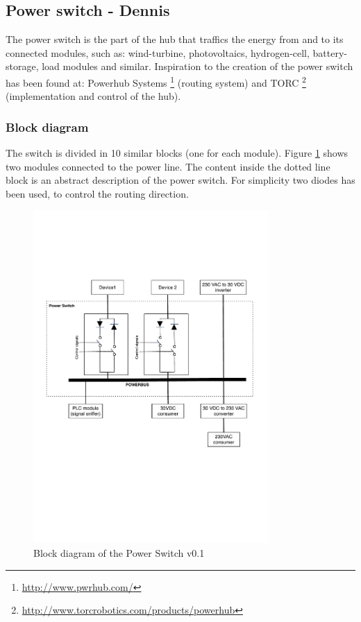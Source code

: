 \subsection{Power switch - Dennis}
The power switch is the part of the hub that traffics the energy from and to its connected modules, such as: wind-turbine, photovoltaics, hydrogen-cell, battery-storage, load modules and similar. Inspiration to the creation of the power switch has been found at: Powerhub Systems \footnote{\url{http://www.pwrhub.com/}} (routing system) and TORC \footnote{\url{http://www.torcrobotics.com/products/powerhub}} (implementation and control of the hub).
\subsubsection{Block diagram}
The switch is divided in 10 similar blocks (one for each module). Figure \ref{fig:ps_block_v0_1} shows two modules connected to the power line. The content inside the dotted line block is an abstract description of the power switch. For simplicity two diodes has been used, to control the routing direction.
\begin{figure}[H]
	\begin{centering}
		\includegraphics[width=0.8\textwidth,page=1,angle=0]{images/power_switch_block_diagram_v0_1}
		\caption{Block diagram of the Power Switch v0.1}
		\label{fig:ps_block_v0_1}
	\end{centering}
\end{figure}
